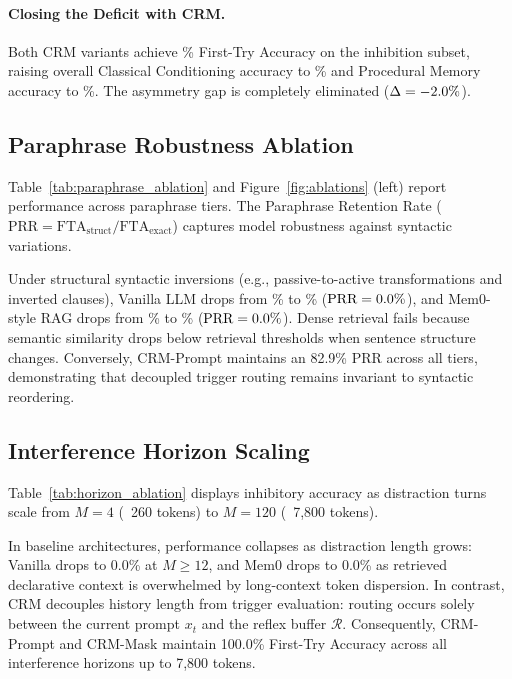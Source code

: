 \documentclass[10pt,conference]{IEEEtran}
\begin{document}
\paragraph{Closing the Deficit with CRM.}
Both CRM variants achieve \ValcrmpromptInhibition\% First-Try Accuracy on the inhibition subset, raising overall Classical Conditioning accuracy to \ValcrmpromptClassical\% and Procedural Memory accuracy to \ValcrmpromptProcedural\%. The asymmetry gap is completely eliminated ($\Delta = -2.0\%$).

\subsection{Paraphrase Robustness Ablation}

Table~\ref{tab:paraphrase_ablation} and Figure~\ref{fig:ablations} (left) report performance across paraphrase tiers. The Paraphrase Retention Rate ($\text{PRR} = \text{FTA}_{\text{struct}} / \text{FTA}_{\text{exact}}$) captures model robustness against syntactic variations.

Under structural syntactic inversions (e.g., passive-to-active transformations and inverted clauses), Vanilla LLM drops from \ValParavanillaExact\% to \ValParavanillaStructural\% ($\text{PRR} = 0.0\%$), and Mem0-style RAG drops from \ValParamemZeroragExact\% to \ValParamemZeroragStructural\% ($\text{PRR} = 0.0\%$). Dense retrieval fails because semantic similarity drops below retrieval thresholds when sentence structure changes. Conversely, CRM-Prompt maintains an 82.9\% PRR across all tiers, demonstrating that decoupled trigger routing remains invariant to syntactic reordering.



\subsection{Interference Horizon Scaling}

Table~\ref{tab:horizon_ablation} displays inhibitory accuracy as distraction turns scale from $M=4$ (~260 tokens) to $M=120$ (~7,800 tokens).

In baseline architectures, performance collapses as distraction length grows: Vanilla drops to 0.0\% at $M \ge 12$, and Mem0 drops to 0.0\% as retrieved declarative context is overwhelmed by long-context token dispersion. In contrast, CRM decouples history length from trigger evaluation: routing occurs solely between the current prompt $x_t$ and the reflex buffer $\mathcal{R}$. Consequently, CRM-Prompt and CRM-Mask maintain 100.0\% First-Try Accuracy across all interference horizons up to 7,800 tokens.
\end{document}
